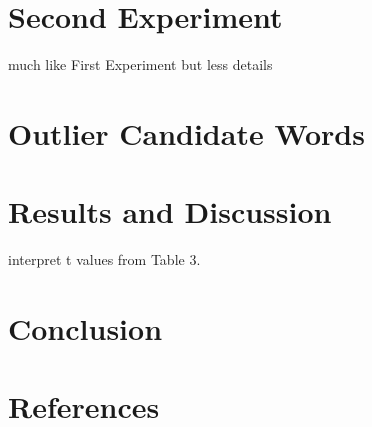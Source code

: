 \documentclass[11pt]{article}
\begin{document}
 \section{Second Experiment}

much like First Experiment but less details

\section{Outlier Candidate Words}

\section{Results and Discussion}

interpret t values from Table 3.

\section{Conclusion}

\section*{References}
\end{document}
